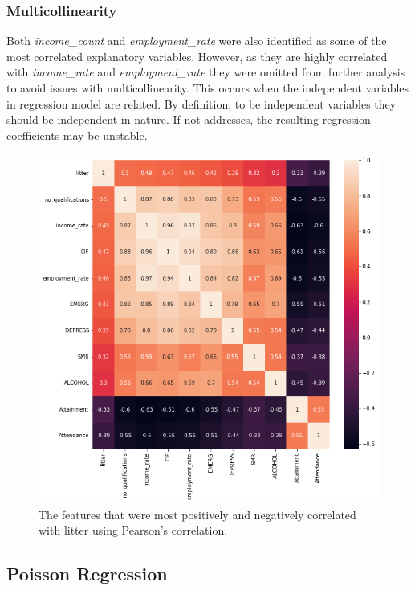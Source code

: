 \documentclass{thesis}
\begin{document}
\subsubsection{Multicollinearity}

Both \textit{income\_count} and \textit{employment\_rate} were also identified as some of the most correlated explanatory variables. However, as they are highly correlated with \textit{income\_rate} and \textit{employment\_rate} they were omitted from further analysis to avoid issues with multicollinearity. This occurs when the independent variables in regression model are related. By definition, to be independent variables they should be independent in nature. If not addresses, the resulting regression coefficients may be unstable.

\begin{figure}[h]
    \centering
    \includegraphics[scale=0.45]{images/corr-matrix.png}
    \caption{The features that were most positively and negatively correlated with litter using Pearson's correlation.}
    \label{fig:correlation-matrix}
\end{figure}

\subsection{Poisson Regression}
\end{document}
